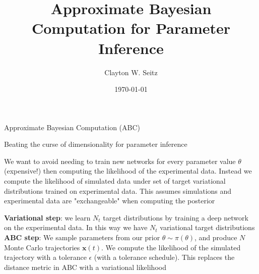 \documentclass[aspectratio=1610]{beamer}					%
\title{Approximate Bayesian Computation for Parameter Inference}	%
\author{Clayton W. Seitz}								%
\date{\today}									%
\begin{document}
\begin{frame}
  \titlepage
\end{frame}

\begin{frame}{Approximate Bayesian Computation (ABC)}

\end{frame}


\begin{frame}{Beating the curse of dimensionality for parameter inference}

We want to avoid needing to train new networks for every parameter value $\theta$ (expensive!) then computing the likelihood of the experimental data. Instead we compute the likelihood of simulated data under set of target variational distributions trained on experimental data. This assumes simulations and experimental data are "exchangeable" when computing the posterior

\vspace{0.2in}
\textbf{Variational step}: we learn $N_{t}$ target distributions by training a deep network on the experimental data. In this way we have $N_{t}$ variational target distributions\\
\vspace{0.2in}
\textbf{ABC step}: We sample parameters from our prior $\theta \sim \pi(\theta)$, and produce $N$ Monte Carlo trajectories $\mathbf{x}(t)$. We compute the likelihood of the simulated trajectory with a tolerance $\epsilon$ (with a tolerance schedule). This replaces the distance metric in ABC with a variational likelihood

\end{frame}
\end{document}
